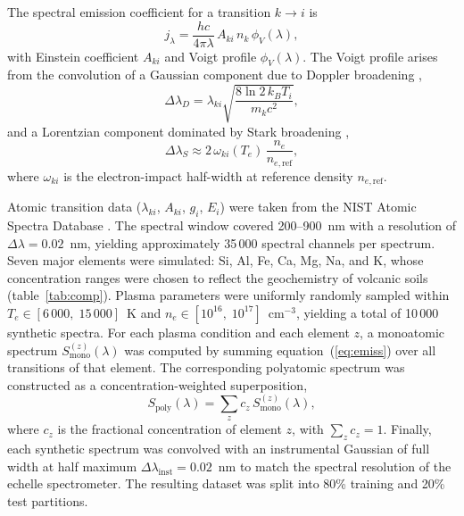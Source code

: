 \documentclass{iopjournal}
\begin{document}
The spectral emission coefficient for a transition $k \to i$ is \cite{fujimoto_plasma_2004}
\begin{equation} \label{eq:emiss}
j_\lambda = \frac{hc}{4\pi\lambda}\,A_{ki}\,n_k\,\phi_V(\lambda),
\end{equation}
with Einstein coefficient $A_{ki}$ and Voigt profile $\phi_V(\lambda)$.
The Voigt profile arises from the convolution of a Gaussian component due to Doppler broadening \cite{griem_spectral_1974},
\begin{equation} \label{eq:doppler}
\Delta\lambda_D = \lambda_{ki}\sqrt{\frac{8\ln 2\,k_B T_i}{m_k c^2}},
\end{equation}
and a Lorentzian component dominated by Stark broadening \cite{griem_spectral_1974},
\begin{equation} \label{eq:stark}
\Delta\lambda_S \approx 2\,\omega_{ki}(T_e)\,\frac{n_e}{n_{e,\mathrm{ref}}},
\end{equation}
where $\omega_{ki}$ is the electron-impact half-width at reference density $n_{e,\mathrm{ref}}$.

Atomic transition data ($\lambda_{ki}$, $A_{ki}$, $g_i$, $E_i$) were taken from the NIST Atomic Spectra Database \cite{kramida_nist_2024}.
The spectral window covered 200--900~nm with a resolution of $\Delta\lambda = 0.02$~nm, yielding approximately 35\,000 spectral channels per spectrum.
Seven major elements were simulated: Si, Al, Fe, Ca, Mg, Na, and K, whose concentration ranges were chosen to reflect the geochemistry of volcanic soils (table~\ref{tab:comp}).
Plasma parameters were uniformly randomly sampled within $T_e \in [6\,000,\;15\,000]$~K and $n_e \in [10^{16},\;10^{17}]$~cm$^{-3}$, yielding a total of 10\,000 synthetic spectra.
For each plasma condition and each element $z$, a monoatomic spectrum $S_{\mathrm{mono}}^{(z)}(\lambda)$ was computed by summing equation~(\ref{eq:emiss}) over all transitions of that element.
The corresponding polyatomic spectrum was constructed as a concentration-weighted superposition,
\begin{equation} \label{eq:poly}
S_{\mathrm{poly}}(\lambda) = \sum_{z} c_z \, S_{\mathrm{mono}}^{(z)}(\lambda),
\end{equation}
where $c_z$ is the fractional concentration of element $z$, with $\sum_z c_z = 1$.
Finally, each synthetic spectrum was convolved with an instrumental Gaussian of full width at half maximum $\Delta\lambda_{\mathrm{inst}} = 0.02$~nm to match the spectral resolution of the echelle spectrometer.
The resulting dataset was split into 80\% training and 20\% test partitions.
\end{document}
